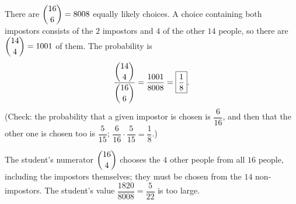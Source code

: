 There are $\dbinom{16}{6}=8008$ equally likely choices. A choice containing both impostors consists of the $2$ impostors and $4$ of the other $14$ people, so there are $\dbinom{14}{4}=1001$ of them. The probability is
\[\dfrac{\dbinom{14}{4}}{\dbinom{16}{6}}=\dfrac{1001}{8008}=\boxed{\dfrac18}.\]
(Check: the probability that a given impostor is chosen is $\dfrac{6}{16}$, and then that the other one is chosen too is $\dfrac{5}{15}$; $\dfrac{6}{16}\cdot\dfrac{5}{15}=\dfrac18$.)

The student's numerator $\dbinom{16}{4}$ chooses the $4$ other people from all $16$ people, including the impostors themselves; they must be chosen from the $14$ non-impostors. The student's value $\dfrac{1820}{8008}=\dfrac{5}{22}$ is too large.
